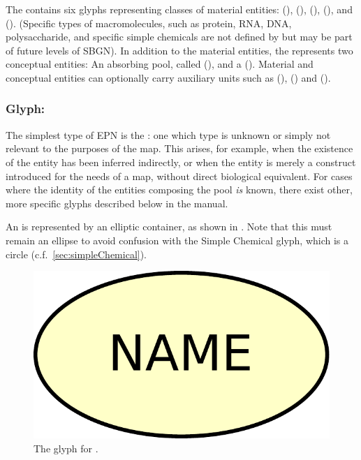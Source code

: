 The \PDl contains six glyphs representing classes of material entities:  (),  (),  (),  (), and  ().  (Specific types of macromolecules, such as protein, RNA, DNA, polysaccharide, and specific simple chemicals are not defined by \PD but may be part of future levels of SBGN). In addition to the material entities, the \PDl represents two conceptual entities: An absorbing pool, called  (), and a  ().  Material and conceptual entities can optionally carry auxiliary units such as  (),   () and  ().

\subsubsection{Glyph: }
\label{sec:unspecifiedEntity}

The simplest type of EPN is the : one which type is unknown or simply not relevant to the purposes of the map. This arises, for example, when the existence of the entity has been inferred indirectly, or when the entity is merely a construct introduced for the needs of a map, without direct biological equivalent.  For cases where the identity of the entities composing the pool \emph{is} known, there exist other, more specific glyphs described below in the manual.

An  is represented by an elliptic container, as shown in .  Note that this
must remain an ellipse to avoid confusion with the Simple Chemical glyph, which is a circle (c.f.\, \ref{sec:simpleChemical}).

\begin{figure}[H]
  \centering
  \includegraphics[scale = 0.3]{le_images/unspecified}
  \caption{The \PD glyph for .}
  \label{fig:unspecified}
\end{figure}

